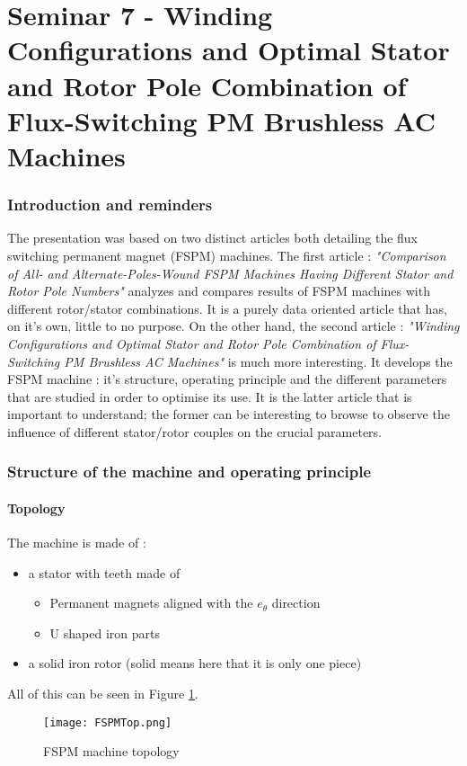 \part{Seminar 7 - Winding Configurations and Optimal Stator and Rotor Pole Combination of Flux-Switching PM Brushless AC Machines}


\section{Introduction and reminders}
The presentation was based on two distinct articles both detailing the flux switching permanent magnet (FSPM) machines. The first article : \textit{"Comparison of All- and Alternate-Poles-Wound FSPM Machines Having Different Stator and Rotor Pole Numbers"} analyzes and compares results of FSPM machines with different rotor/stator combinations. It is a purely data oriented article that has, on it's own, little to no purpose. On the other hand, the second article : \textit{"Winding Configurations and Optimal Stator and Rotor Pole Combination of Flux-Switching PM Brushless AC Machines"} is much more interesting. It develops the FSPM machine : it's structure, operating principle and the different parameters that are studied in order to optimise its use. It is the latter article that is important to understand; the former can be interesting to browse to observe the influence of different stator/rotor couples on the crucial parameters.

%

\section{Structure of the machine and operating principle}
\subsection{Topology}
The machine is made of : 
\begin{itemize}
    \item a stator with teeth made of 
        \begin{itemize}
            \item Permanent magnets aligned with the $e_\theta$ direction
            \item U shaped iron parts
        \end{itemize}
    \item a solid iron rotor (solid means here that it is only one piece) 
\end{itemize}
All of this can be seen in Figure \ref{fig:FSPMTop}. 
\begin{figure}
    \centering
    \texttt{[image: FSPMTop.png]}
    \caption{FSPM machine topology}
    \label{fig:FSPMTop}
\end{figure}

